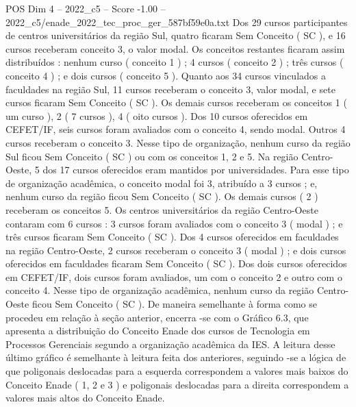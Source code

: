 \begin{textsample}{POS Dim 4 – 2022\_c5 – Score -1.00 – 2022\_c5/enade\_2022\_tec\_proc\_ger\_587bf59e0a.txt}
Dos 29 cursos participantes de centros universitários da região Sul, quatro ficaram Sem Conceito ( SC ), e 16 cursos receberam conceito 3, o valor modal.
Os conceitos restantes ficaram assim distribuídos : nenhum curso ( conceito 1 ) ; 4 cursos ( conceito 2 ) ; três cursos ( conceito 4 ) ; e dois cursos ( conceito 5 ).
Quanto aos 34 cursos vinculados a faculdades na região Sul, 11 cursos receberam o conceito 3, valor modal, e sete cursos ficaram Sem Conceito ( SC ).
Os demais cursos receberam os conceitos 1 ( um curso ), 2 ( 7 cursos ), 4 ( oito cursos ).
Dos 10 cursos oferecidos em CEFET/IF, seis cursos foram avaliados com o conceito 4, sendo modal.
Outros 4 cursos receberam o conceito 3.
Nesse tipo de organização, nenhum curso da região Sul ficou Sem Conceito ( SC ) ou com os conceitos 1, 2 e 5.
Na região Centro-Oeste, 5 dos 17 cursos oferecidos eram mantidos por universidades.
Para esse tipo de organização acadêmica, o conceito modal foi 3, atribuído a 3 cursos ; e, nenhum curso da região ficou Sem Conceito ( SC ).
Os demais cursos ( 2 ) receberam os conceitos 5.
Os centros universitários da região Centro-Oeste contaram com 6 cursos : 3 cursos foram avaliados com o conceito 3 ( modal ) ; e três cursos ficaram Sem Conceito ( SC ).
Dos 4 cursos oferecidos em faculdades na região Centro-Oeste, 2 cursos receberam o conceito 3 ( modal ) ; e dois cursos oferecidos em faculdades ficaram Sem Conceito ( SC ).
Dos dois cursos oferecidos em CEFET/IF, dois cursos foram avaliados, um com o conceito 2 e outro com o conceito 4.
Nesse tipo de organização acadêmica, nenhum curso da região Centro-Oeste ficou Sem Conceito ( SC ).
De maneira semelhante à forma como se procedeu em relação à seção anterior, encerra -se com o Gráfico 6.3, que apresenta a distribuição do Conceito Enade dos cursos de Tecnologia em Processos Gerenciais segundo a organização acadêmica da IES.
A leitura desse último gráfico é semelhante à leitura feita dos anteriores, seguindo -se a lógica de que poligonais deslocadas para a esquerda correspondem a valores mais baixos do Conceito Enade ( 1, 2 e 3 ) e poligonais deslocadas para a direita correspondem a valores mais altos do Conceito Enade.

\end{textsample}
